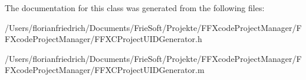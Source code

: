 The documentation for this class was generated from the following files\-:\begin{DoxyCompactItemize}
\item 
/\-Users/florianfriedrich/\-Documents/\-Frie\-Soft/\-Projekte/\-F\-F\-Xcode\-Project\-Manager/\-F\-F\-Xcode\-Project\-Manager/F\-F\-X\-C\-Project\-U\-I\-D\-Generator.\-h\item 
/\-Users/florianfriedrich/\-Documents/\-Frie\-Soft/\-Projekte/\-F\-F\-Xcode\-Project\-Manager/\-F\-F\-Xcode\-Project\-Manager/F\-F\-X\-C\-Project\-U\-I\-D\-Generator.\-m\end{DoxyCompactItemize}
